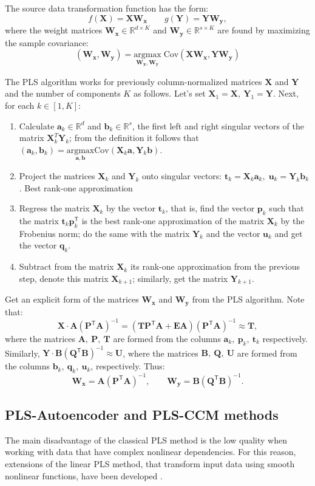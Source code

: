 \documentclass[bst/sn-mathphys]{sn-jnl}%
\newcommand{\bx}{\ensuremath{\mathbf{x}}}
\newcommand{\by}{\mathbf{y}}
\newcommand{\ba}{\mathbf{a}}
\newcommand{\bb}{\mathbf{b}}
\newcommand{\bp}{\mathbf{p}}
\newcommand{\bq}{\mathbf{q}}
\newcommand{\bt}{\mathbf{t}}
\newcommand{\bu}{\mathbf{u}}
\newcommand{\bT}{\mathbf{T}}
\newcommand{\bX}{\mathbf{X}}
\newcommand{\bW}{\mathbf{W}}
\newcommand{\bY}{\mathbf{Y}}
\newcommand{\bU}{\mathbf{U}}
\newcommand{\bQ}{\mathbf{Q}}
\newcommand{\bP}{\mathbf{P}}
\newcommand{\bA}{\mathbf{A}}
\newcommand{\bB}{\mathbf{B}}
\newcommand{\bE}{\mathbf{E}}
\newcommand{\dR}{\mathbb{R}}
\renewcommand{\T}{^{\mathsf{T}}}
\theoremstyle{thmstyleone}%
\theoremstyle{thmstyletwo}%
\theoremstyle{thmstylethree}%
\begin{document}
The source data transformation function has the form:
$$f(\bX) = \bX\bW_{\bx}\qquad g(\bY) = \bY\bW_{\by}, $$
where the weight matrices $\bW_{\bx} \in \dR^{d \times K}$ and $\bW_{\by}\in \dR^{s \times K}$ are found by maximizing the sample covariance:
$$ (\bW_{\bx}, \bW_{\by}) = \underset{\bW_{\bx}, \bW_{\by}}{\text{argmax}}\; \text{Cov}(\bX\bW_{\bx}, \bY\bW_{\by})$$

The PLS algorithm works for previously column-normalized matrices $\bX$ and $\bY$ and the number of components $K$ as follows.
Let's set $\bX_1 = \bX, \: \bY_1 = \bY$.
Next, for each $k \in [1, K]$:
\begin{enumerate}
	\item Calculate $\ba_k\in \dR^d$ and $\bb_k\in \dR^s$, the first left and right singular vectors of the matrix $\bX_k^T\bY_k$; from the definition it follows that $(\ba_k, \bb_k) = \underset{\ba, \bb}{\text{argmax}} \text{Cov} (\bX_k \ba, \bY_k \bb)$.
	\item Project the matrices $\bX_k$ and $\bY_k$ onto singular vectors: $\bt_k = \bX_k \ba_k, \; \bu_k = \bY_k\bb_k$.
	Best rank-one approximation
	\item Regress the matrix $\bX_k$ by the vector $\bt_k$, that is, find the vector $\bp_k$ such that the matrix $\bt_k\bp_k\T$ is the best rank-one approximation of the matrix $\bX_k$ by the Frobenius norm; do the same with the matrix $\bY_k$ and the vector $\bu_k$ and get the vector $\bq_k$.
	\item Subtract from the matrix $\bX_k$ its rank-one approximation from the previous step, denote this matrix $\bX_{k+1}$; similarly, get the matrix $\bY_{k+1}$.
\end{enumerate}

Get an explicit form of the matrices $\bW_{\bx}$ and $\bW_{\by}$ from the PLS algorithm. Note that:
$$\bX\cdot\bA(\bP\T\bA)^{-1} = (\bT\bP\T\bA + \bE\bA)(\bP \T \bA)^{-1} \approx\bT, $$
where the matrices $\bA, \:\bP, \:\bT$ are formed from the columns $\ba_k, \:\bp_k, \:\bt_k$ respectively. 
Similarly, $\bY\cdot\bB(\bQ\T\bB)^{-1} \approx \bU$, where the matrices $\bB, \:\bQ, \:\bU$ are formed from the columns $\bb_k, \:\bq_k, \: \bu_k$, respectively.
Thus:
$$\bW_{\bx} = \bA(\bP\T\bA)^{-1}, \qquad\bW_{\by}= \bB(\bQ\T\bB)^{-1}. $$

\subsection{PLS-Autoencoder and PLS-CCM methods}
The main disadvantage of the classical PLS method is the low quality when working with data that have complex nonlinear dependencies.
For this reason, extensions of the linear PLS method, that transform input data using smooth nonlinear functions, have been developed .
\end{document}
